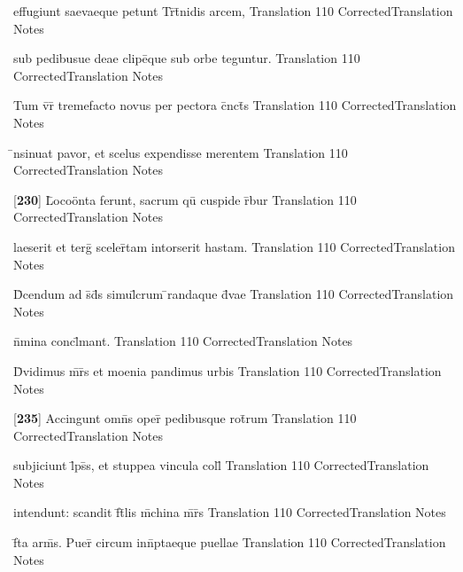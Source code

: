 \latline
  {effugiunt saevaeque petunt Tr\={\macron {\i}}t\={}nidis arcem,}
  { Translation }
  {110}
  { CorrectedTranslation }
  { Notes }


\latline
  {sub pedibusue deae clipe\={\macron {\i}}que sub orbe teguntur.}
  { Translation }
  {110}
  { CorrectedTranslation }
  { Notes }


\latline
  {Tum v\={}r\={} tremefacto novus per pectora c\={}nct\={\macron {\i}}s}
  { Translation }
  {110}
  { CorrectedTranslation }
  { Notes }


\latline
  {\={\macron {\i}}nsinuat pavor, et scelus expendisse merentem}
  { Translation }
  {110}
  { CorrectedTranslation }
  { Notes }


\latline
  {[\textbf{230}] L\={}oco\"{o}nta ferunt, sacrum qu\={\macron {\i}} cuspide r\={}bur }
  { Translation }
  {110}
  { CorrectedTranslation }
  { Notes }


\latline
  {laeserit et terg\={} sceler\={}tam intorserit hastam.}
  { Translation }
  {110}
  { CorrectedTranslation }
  { Notes }


\latline
  {D\={}cendum ad s\={}d\={}s simul\={}crum \={}randaque d\={\macron {\i}}vae}
  { Translation }
  {110}
  { CorrectedTranslation }
  { Notes }


\latline
  {n\={}mina concl\={}mant.}
  { Translation }
  {110}
  { CorrectedTranslation }
  { Notes }


\latline
  {D\={\macron {\i}}vidimus m\={}r\={}s et moenia pandimus urbis}
  { Translation }
  {110}
  { CorrectedTranslation }
  { Notes }


\latline
  {[\textbf{235}] Accingunt omn\={}s oper\={\macron {\i}} pedibusque rot\={}rum}
  { Translation }
  {110}
  { CorrectedTranslation }
  { Notes }


\latline
  {subjiciunt l\={}ps\={}s, et stuppea vincula coll\={}}
  { Translation }
  {110}
  { CorrectedTranslation }
  { Notes }


\latline
  {intendunt: scandit f\={}t\={}lis m\={}china m\={}r\={}s}
  { Translation }
  {110}
  { CorrectedTranslation }
  { Notes }


\latline
  {f\={}ta arm\={\macron {\i}}s.  Puer\={\macron {\i}} circum inn\={}ptaeque puellae}
  { Translation }
  {110}
  { CorrectedTranslation }
  { Notes }


